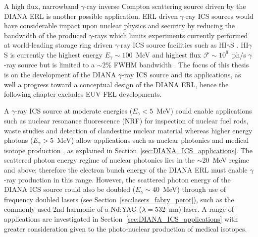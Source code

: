 \documentclass[../main.tex]{subfiles}
\begin{document}
A high flux, narrowband $\gamma$-ray inverse Compton scattering source driven by the DIANA ERL is another possible application. ERL driven $\gamma$-ray ICS sources would have considerable impact upon nuclear physics and security \cite{budker2021expanding} by reducing the bandwidth of the produced $\gamma$-rays which limits experiments currently performed at world-leading storage ring driven $\gamma$-ray ICS source facilities such as HI$\gamma$S \cite{weller2009research}. HI$\gamma$S is currently the highest energy $E_{\gamma} \sim 100$~\si{\mega\electronvolt} and highest flux $\mathcal{F} \sim 10^{9}$~ph/\si{\second} $\gamma$-ray source but is limited to a $\sim2$\% FWHM bandwidth \cite{weller2009research}.  The focus of this thesis is on the development of the DIANA $\gamma$-ray ICS source and its applications, as well a progress toward a conceptual design of the DIANA ERL, hence the following chapter excludes EUV FEL developments.

A $\gamma$-ray ICS source at moderate energies ($E_{\gamma} < 5$~\si{\mega\electronvolt}) could enable applications such as nuclear resonance fluorescence (NRF) for inspection of nuclear fuel rods, waste studies and detection of clandestine nuclear material \cite{angell2015demonstration,bolind2015states} whereas higher energy photons ($E_{\gamma} > 5$~\si{\mega\electronvolt}) allow applications such as nuclear photonics \cite{budker2021expanding} and medical isotope production \cite{habs2011production}, as explained in Section~\ref{sec:DIANA_ICS_applications}. The scattered photon energy regime of nuclear photonics lies in the $\sim$20~\si{\mega\electronvolt} regime and above; therefore the electron bunch energy of the DIANA ERL must enable $\gamma$-ray production in this range. However, the scattered photon energy of the DIANA ICS source could also be doubled ($E_{\gamma}\sim 40$~\si{\mega\electronvolt}) through use of frequency doubled lasers (see Section~\ref{sec:lasers_fabry_perot}), such as the commonly used 2nd harmonic of a Nd:YAG ($\lambda =$532~\si{\nano\meter}) laser. A range of applications are investigated in Section~\ref{sec:DIANA_ICS_applications} with greater consideration given to the photo-nuclear production of medical isotopes. 
\end{document}
